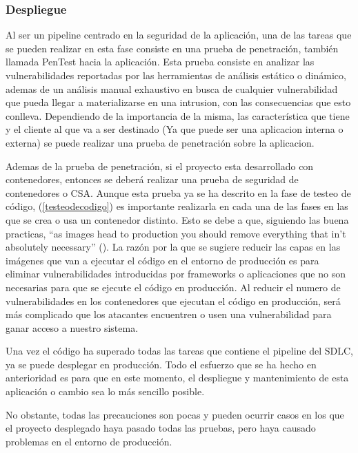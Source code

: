 \documentclass[12pt]{report} %
\begin{document}
\subsubsection{Despliegue} 

Al ser un \gls{pipeline} centrado en la seguridad de la aplicación, una de las tareas
que se pueden realizar en esta fase consiste en una prueba de penetración,
también llamada \gls{PenTest} hacia la aplicación.
Esta prueba consiste en analizar las vulnerabilidades reportadas por las
herramientas de análisis estático o dinámico, ademas de un análisis manual
exhaustivo en busca de cualquier vulnerabilidad que pueda llegar a
materializarse en una intrusion, con las consecuencias que esto conlleva.  
Dependiendo de la importancia de la misma, las característica que tiene y el
cliente al que va a ser destinado (Ya que puede ser una aplicacion interna o
externa) se puede realizar una prueba de penetración sobre la aplicacion.

Ademas de la prueba de penetración, si el proyecto esta desarrollado con
contenedores, entonces se deberá realizar una prueba de seguridad de
contenedores o \gls{CSA}.
Aunque esta prueba ya se ha descrito en la fase de testeo de código,
(\ref{testeodecodigo}) es importante realizarla en cada una de las fases en las
que se crea o usa un contenedor distinto.
Esto se debe a que, siguiendo las buena practicas, ``as images head
to production you should remove everything that in’t absolutely necessary''
(\cite{Armstrong2020}).
La razón por la que se sugiere reducir las capas en las imágenes que van a
ejecutar el código en el entorno de producción es para eliminar vulnerabilidades
introducidas por frameworks o aplicaciones que no son necesarias para que se
ejecute el código en producción.
Al reducir el numero de vulnerabilidades en los contenedores que ejecutan el
código en producción, será más complicado que los atacantes encuentren o usen
una vulnerabilidad para ganar acceso a nuestro sistema.

Una vez el código ha superado todas las tareas que contiene el \gls{pipeline}
del \gls{SDLC}, ya se puede desplegar en producción.
Todo el esfuerzo que se ha hecho en anterioridad es para que en este momento, el
despliegue y mantenimiento de esta aplicación o cambio sea lo más sencillo
posible.

No obstante, todas las precauciones son pocas y pueden ocurrir casos en los que
el proyecto desplegado haya pasado todas las pruebas, pero haya causado
problemas en el entorno de producción.
\end{document}

